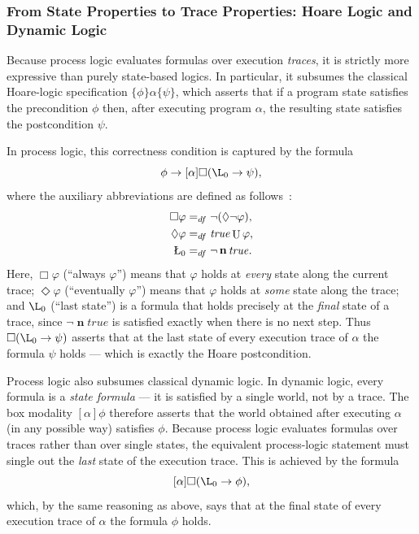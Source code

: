 \documentclass[manuscript,screen]{acmart}
\newcommand{\dddef}[0]{=_{df}}
\newcommand{\true}[0]{\mathit{true}}
\DeclareMathOperator{\nxt}{\mathbf{n}}
\DeclareMathOperator{\unt}{U}
\newcommand{\A}[1]{\mbox{ \textbf{#1} }}
\newcommand{\EMO}{\A{EMO}}
\begin{document}
\subsubsection{From State Properties to Trace Properties: Hoare Logic and Dynamic Logic}

Because process logic evaluates formulas over execution \emph{traces}, it is strictly more expressive than purely state-based logics.  In particular, it subsumes the classical Hoare-logic specification $\{\phi\}\alpha\{\psi\}$, which asserts that if a program state satisfies the precondition $\phi$ then, after executing program $\alpha$, the resulting state satisfies the postcondition $\psi$.

In process logic, this correctness condition is captured by the formula
$$
\phi\to [\alpha]\Box(\L_0\to \psi), 
$$
where the auxiliary abbreviations are defined as follows~\cite{Harel82}:
$$
\begin{aligned}
    \Box \varphi&\dddef \neg(\Diamond \neg \varphi),\\
    \Diamond \varphi&\dddef \true \unt \varphi,\\
    \L_0&\dddef \neg \nxt \true.
\end{aligned}
$$
Here, $\Box\varphi$ (``always $\varphi$'') means that $\varphi$ holds at \emph{every} state along the current trace; $\Diamond\varphi$ (``eventually $\varphi$'') means that $\varphi$ holds at \emph{some} state along the trace; and $\L_0$ (``last state'') is a formula that holds precisely at the \emph{final} state of a trace, since $\neg\nxt\true$ is satisfied exactly when there is no next step.  Thus $\Box(\L_0\to\psi)$ asserts that at the last state of every execution trace of $\alpha$ the formula $\psi$ holds --- which is exactly the Hoare postcondition. 

Process logic also subsumes classical dynamic logic.  In dynamic logic, every formula is a \emph{state formula} --- it is satisfied by a single world, not by a trace.  The box modality $[\alpha]\phi$ therefore asserts that the world obtained after executing $\alpha$ (in any possible way) satisfies $\phi$.  Because process logic evaluates formulas over traces rather than over single states, the equivalent process-logic statement must single out the \emph{last} state of the execution trace.  This is achieved by the formula
$$
    [\alpha]\Box(\L_0\to \phi),
$$
which, by the same reasoning as above, says that at the final state of every execution trace of $\alpha$ the formula $\phi$ holds.  
\end{document}
